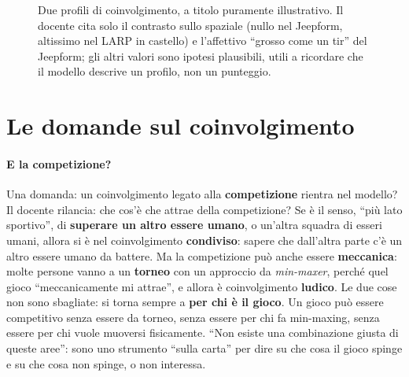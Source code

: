 \begin{figure}[htbp]
\centering
{}
\caption{Due profili di coinvolgimento, a titolo puramente illustrativo. Il
docente cita solo il contrasto sullo spaziale (nullo nel Jeepform, altissimo
nel LARP in castello) e l'affettivo ``grosso come un tir'' del Jeepform; gli
altri valori sono ipotesi plausibili, utili a ricordare che il modello descrive
un profilo, non un punteggio.}
\label{a3:fig:pim-profili}
\end{figure}

\section{Le domande sul coinvolgimento}
\label{a3:sec:pim-domande}

\paragraph{E la competizione?} Una domanda: un coinvolgimento legato alla
\textbf{competizione} rientra nel modello? Il docente rilancia: che cos'è che
attrae della competizione? Se è il senso, ``più lato sportivo'', di
\textbf{superare un altro essere umano}, o un'altra squadra di esseri umani,
allora si è nel coinvolgimento \textbf{condiviso}: sapere che dall'altra parte
c'è un altro essere umano da battere. Ma la competizione può anche essere
\textbf{meccanica}: molte persone vanno a un \textbf{torneo} con un approccio da
\emph{min-maxer}, perché quel gioco ``meccanicamente mi attrae'', e allora è
coinvolgimento \textbf{ludico}. Le due cose non sono sbagliate: si torna sempre a
\textbf{per chi è il gioco}. Un gioco può essere competitivo senza essere da
torneo, senza essere per chi fa min-maxing, senza essere per chi vuole muoversi
fisicamente. ``Non esiste una combinazione giusta di queste aree'': sono uno
strumento ``sulla carta'' per dire su che cosa il gioco spinge e su che cosa non
spinge, o non interessa.

